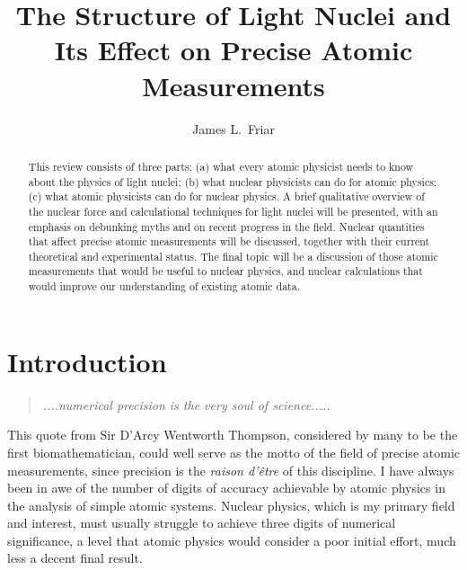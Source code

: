 \documentclass{svmult}
\begin{document}
\title*{The Structure of Light Nuclei and Its Effect on Precise Atomic 
Measurements}

\author{James L.\ Friar}

\label{04}
\maketitle

\vspace*{-2.5in}
\hfill {}
\vspace*{2.2in}

\begin{abstract}
This review consists of three parts: (a) what every atomic physicist needs to
know about the physics of light nuclei; (b) what nuclear physicists can do for
atomic physics; (c) what atomic physicists can do for nuclear physics. A brief
qualitative overview of the nuclear force and calculational techniques for light
nuclei will be presented, with an emphasis on debunking myths and on recent
progress in the field. Nuclear quantities that affect precise atomic
measurements will be discussed, together with their current theoretical and
experimental status. The final topic will be a discussion of those atomic
measurements that would be useful to nuclear physics, and nuclear calculations
that would improve our understanding of existing atomic data.
\end{abstract}

\section{Introduction}

\begin{quote} 
\em ....numerical precision is the very soul of science.....
\end{quote}

This quote\cite{darcy} from Sir D'Arcy Wentworth Thompson, considered by many to
be the first biomathematician, could well serve as the motto of the field of
precise atomic measurements, since precision is the {\it raison d'\^etre} of
this discipline. I have always been in awe of the number of digits of accuracy
achievable by atomic physics in the analysis of simple atomic
systems\cite{2S1S}.  Nuclear physics, which is my primary field and interest,
must usually struggle to achieve three digits of numerical significance, a level
that atomic physics would consider a poor initial effort, much less a decent
final result.
\end{document}
